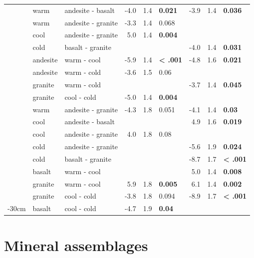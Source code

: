 \documentclass[english,man,floatsintext]{apa6}
\begin{document}
\begin{longtable}[t]{lllrrlrrl}
\endfoot
\bottomrule
\endlastfoot
 & warm & andesite - basalt & -4.0 & 1.4 & \textbf{0.021} & -3.9 & 1.4 & \textbf{0.036}\\
\nopagebreak
 & warm & andesite - granite & -3.3 & 1.4 & 0.068 &  &  & \\
\nopagebreak
 & cool & andesite - granite & 5.0 & 1.4 & \textbf{0.004} &  &  & \\
\nopagebreak
 & cold & basalt - granite &  &  &  & -4.0 & 1.4 & \textbf{0.031}\\
\nopagebreak
 & andesite & warm - cool & -5.9 & 1.4 & \textbf{< .001} & -4.8 & 1.6 & \textbf{0.021}\\
\nopagebreak
 & andesite & warm - cold & -3.6 & 1.5 & 0.06 &  &  & \\
\nopagebreak
 & granite & warm - cold &  &  &  & -3.7 & 1.4 & \textbf{0.045}\\
\nopagebreak
\multirow[t]{-8}{*}{\raggedright\arraybackslash 0-10cm} & granite & cool - cold & -5.0 & 1.4 & \textbf{0.004} &  &  & \\
\cmidrule{1-9}\pagebreak[0]
 & warm & andesite - granite & -4.3 & 1.8 & 0.051 & -4.1 & 1.4 & \textbf{0.03}\\
\nopagebreak
 & cool & andesite - basalt &  &  &  & 4.9 & 1.6 & \textbf{0.019}\\
\nopagebreak
 & cool & andesite - granite & 4.0 & 1.8 & 0.08 &  &  & \\
\nopagebreak
 & cold & andesite - granite &  &  &  & -5.6 & 1.9 & \textbf{0.024}\\
\nopagebreak
 & cold & basalt - granite &  &  &  & -8.7 & 1.7 & \textbf{< .001}\\
\nopagebreak
 & basalt & warm - cool &  &  &  & 5.0 & 1.4 & \textbf{0.008}\\
\nopagebreak
 & granite & warm - cool & 5.9 & 1.8 & \textbf{0.005} & 6.1 & 1.4 & \textbf{0.002}\\
\nopagebreak
\multirow[t]{-8}{*}{\raggedright\arraybackslash 10-20cm} & granite & cool - cold & -3.8 & 1.8 & 0.094 & -8.9 & 1.7 & \textbf{< .001}\\
\cmidrule{1-9}\pagebreak[0]
20-30cm & basalt & cool - cold & -4.7 & 1.9 & \textbf{0.04} &  &  & \\*
\end{longtable}
\endgroup{}

\clearpage

\hypertarget{mineral-assemblages}{%
\section{Mineral assemblages}\label{mineral-assemblages}}
\end{document}
